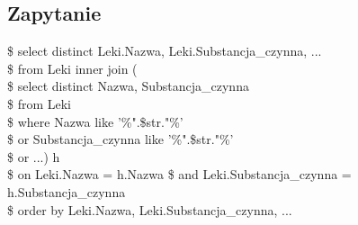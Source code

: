 \documentclass[10pt, a4paper]{article}
\begin{document}
\subsection{Zapytanie}
\$ select distinct Leki.Nazwa, Leki.Substancja\_czynna, ... \\
\$ from Leki inner join ( \\
\$ \hspace{6mm} select distinct Nazwa, Substancja\_czynna \\
\$ \hspace{6mm} from Leki \\
\$ \hspace{6mm} where Nazwa like '\%".\$str."\%' \\
\$ \hspace{6mm} or Substancja\_czynna like '\%".\$str."\%' \\
\$ \hspace{6mm} or ...) h \\
\$ on Leki.Nazwa = h.Nazwa
\$ and Leki.Substancja\_czynna = h.Substancja\_czynna \\
\$ order by Leki.Nazwa, Leki.Substancja\_czynna, ...
\end{document}
